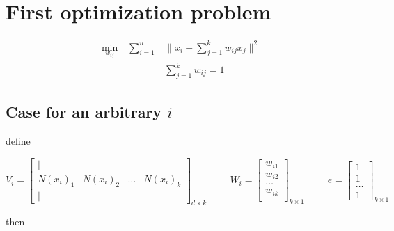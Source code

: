 \documentclass{article}
\begin{document}
    \title{}
    \author{}
    \date{}

    \maketitle

    \section{First optimization problem}

    \begin{equation*}
        \begin{aligned}
            \underset{w_{ij}}{\text{min}} \quad \sum_{i=1}^n & \lVert x_i - \sum_{j=1}^k w_{ij} x_j \rVert^2 \\
            & \sum_{j=1}^k w_{ij} = 1
        \end{aligned}
    \end{equation*}

    \subsection{Case for an arbitrary $i$}

    define

    \[
        V_i = 
        \begin{bmatrix}
            |      &  |     &       & | \\
            N(x_i)_1 & N(x_i)_2 & \dots & N(x_i)_k \\
            |      &  |     &       & |
        \end{bmatrix}_{d \times k}
        \hspace{1cm}
        W_i =
        \begin{bmatrix}
            w_{i1}\\
            w_{i2}\\
            \dots \\
            w_{ik}\\
        \end{bmatrix}_{k \times 1}
        \hspace{1cm}
        e = 
        \begin{bmatrix} 
        1\\
        1\\
        \dots\\
        1
        \end{bmatrix}_{k \times 1}
    \]

    then
    
\end{document}
